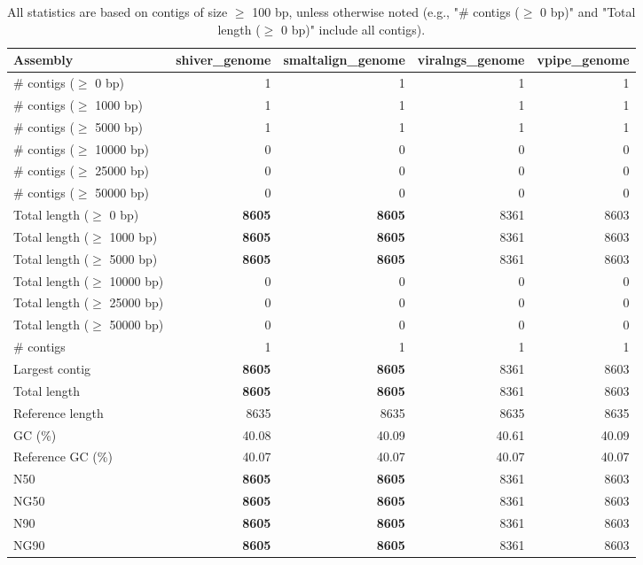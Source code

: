 \documentclass[12pt,a4paper]{article}
\begin{document}
\begin{table}[ht]
\begin{center}
\caption{All statistics are based on contigs of size $\geq$ 100 bp, unless otherwise noted (e.g., "\# contigs ($\geq$ 0 bp)" and "Total length ($\geq$ 0 bp)" include all contigs).}
\begin{tabular}{|l*{4}{|r}|}
\hline
Assembly & shiver\_genome & smaltalign\_genome & viralngs\_genome & vpipe\_genome \\ \hline
\# contigs ($\geq$ 0 bp) & 1 & 1 & 1 & 1 \\ \hline
\# contigs ($\geq$ 1000 bp) & 1 & 1 & 1 & 1 \\ \hline
\# contigs ($\geq$ 5000 bp) & 1 & 1 & 1 & 1 \\ \hline
\# contigs ($\geq$ 10000 bp) & 0 & 0 & 0 & 0 \\ \hline
\# contigs ($\geq$ 25000 bp) & 0 & 0 & 0 & 0 \\ \hline
\# contigs ($\geq$ 50000 bp) & 0 & 0 & 0 & 0 \\ \hline
Total length ($\geq$ 0 bp) & {\bf 8605} & {\bf 8605} & 8361 & 8603 \\ \hline
Total length ($\geq$ 1000 bp) & {\bf 8605} & {\bf 8605} & 8361 & 8603 \\ \hline
Total length ($\geq$ 5000 bp) & {\bf 8605} & {\bf 8605} & 8361 & 8603 \\ \hline
Total length ($\geq$ 10000 bp) & 0 & 0 & 0 & 0 \\ \hline
Total length ($\geq$ 25000 bp) & 0 & 0 & 0 & 0 \\ \hline
Total length ($\geq$ 50000 bp) & 0 & 0 & 0 & 0 \\ \hline
\# contigs & 1 & 1 & 1 & 1 \\ \hline
Largest contig & {\bf 8605} & {\bf 8605} & 8361 & 8603 \\ \hline
Total length & {\bf 8605} & {\bf 8605} & 8361 & 8603 \\ \hline
Reference length & 8635 & 8635 & 8635 & 8635 \\ \hline
GC (\%) & 40.08 & 40.09 & 40.61 & 40.09 \\ \hline
Reference GC (\%) & 40.07 & 40.07 & 40.07 & 40.07 \\ \hline
N50 & {\bf 8605} & {\bf 8605} & 8361 & 8603 \\ \hline
NG50 & {\bf 8605} & {\bf 8605} & 8361 & 8603 \\ \hline
N90 & {\bf 8605} & {\bf 8605} & 8361 & 8603 \\ \hline
NG90 & {\bf 8605} & {\bf 8605} & 8361 & 8603 \\ \hline

\end{tabular}
\end{center}
\end{table}
\end{document}
